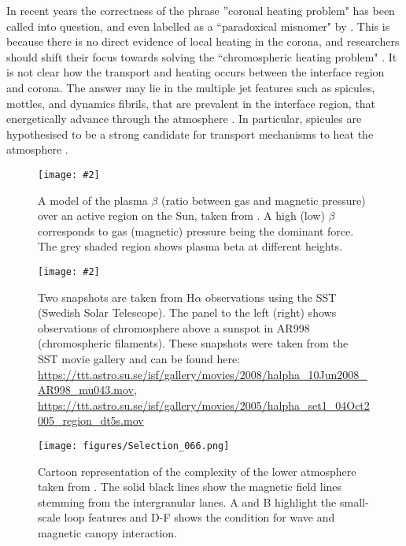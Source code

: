 \documentclass[12pt]{ociamthesis}
\newcommand{\mfig}[4]{
  \begin{figure}
  \begin{center}
  \texttt{[image: \#2]}
  \caption{#3}
  \label{#4}
  \end{center}
  \end{figure}}
\begin{document}
%
In recent years the correctness of the phrase ''coronal heating problem" has been called into question, and even labelled as a ``paradoxical misnomer" by \cite{Aschwanden2007ApJ}. This is because there is no direct evidence of local heating in the corona, and researchers should shift their focus towards solving the ``chromospheric heating problem" \citep{Aschwanden2007ApJ}. It is not clear how the transport and heating occurs between the interface region and corona. The answer may lie in the multiple jet features such as spicules, mottles, and dynamics fibrils, that are prevalent in the interface region, that energetically advance through the atmosphere \citep{Tsiropoula2012}. In particular, spicules are hypothesised to be a strong candidate for transport mechanisms to heat the atmosphere \citep{Kudoh1999ApJ514493K, Pontieu2007PASJ, Kudoh2008IAUS247195K, Mart2017Sci3561269M,Moore2011ApJ731L18M, Pontieu2017ApJ, Samanta2019Sci, Zuo2019AcASn, Bale2019Natur}.    
\mfig{0.725}{figures/Selection_067.png}{A model of the plasma $\beta$ (ratio between gas and magnetic pressure) over an active region on the Sun, taken from \cite{Gary2001SoPh20371G}. A high (low) $\beta$ corresponds to gas (magnetic) pressure being the dominant force. The grey shaded region shows plasma beta at different heights.}{beta_profile_sun}
\mfig{1}{figures/messy_chrom.png}{Two snapshots are taken from H$\alpha$ observations using the SST (Swedish Solar Telescope). The panel to the left (right) shows observations of chromosphere above a sunspot in AR998  (chromospheric filaments). These snapshots were taken from the SST movie gallery and can be found here: \url{https://ttt.astro.su.se/isf/gallery/movies/2008/halpha_10Jun2008_AR998_mu043.mov}, \url{https://ttt.astro.su.se/isf/gallery/movies/2005/halpha_set1_04Oct2005_region_dt5s.mov}}{messy_chromo}
\begin{sidewaysfigure}[ht]
    \texttt{[image: figures/Selection\_066.png]}
    \caption{Cartoon representation of the complexity of the lower atmosphere taken from \cite{Wedemeyer2009SSRv144317W}. The solid black lines show the magnetic field lines stemming from the intergranular lanes. A and B highlight the small-scale loop features and D-F shows the condition for wave and magnetic canopy interaction.}
    \label{fig:chromo_Cart}
\end{sidewaysfigure}
\end{document}
